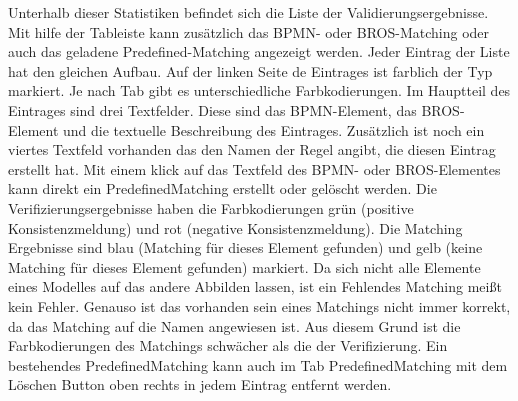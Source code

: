 Unterhalb dieser Statistiken befindet sich die Liste der Validierungsergebnisse.
Mit hilfe der Tableiste kann zusätzlich das BPMN- oder BROS-Matching oder auch das geladene Predefined-Matching angezeigt werden.
Jeder Eintrag der Liste hat den gleichen Aufbau.
Auf der linken Seite de Eintrages ist farblich der Typ markiert. Je nach Tab gibt es unterschiedliche Farbkodierungen.
Im Hauptteil des Eintrages sind drei Textfelder.
Diese sind das BPMN-Element, das BROS-Element und die textuelle Beschreibung des Eintrages.
Zusätzlich ist noch ein viertes Textfeld vorhanden das den Namen der Regel angibt, die diesen Eintrag erstellt hat.
Mit einem klick auf das Textfeld des BPMN- oder BROS-Elementes kann direkt ein PredefinedMatching erstellt oder gelöscht werden.
Die Verifizierungsergebnisse haben die Farbkodierungen grün (positive Konsistenzmeldung) und rot (negative Konsistenzmeldung).
Die Matching Ergebnisse sind blau (Matching für dieses Element gefunden) und gelb (keine Matching für dieses Element gefunden) markiert.
Da sich nicht alle Elemente eines Modelles auf das andere Abbilden lassen, ist ein Fehlendes Matching meißt kein Fehler.
Genauso ist das vorhanden sein eines Matchings nicht immer korrekt, da das Matching auf die Namen angewiesen ist. 
Aus diesem Grund ist die Farbkodierungen des Matchings schwächer als die der Verifizierung.
Ein bestehendes PredefinedMatching kann auch im Tab PredefinedMatching mit dem Löschen Button oben rechts in jedem Eintrag entfernt werden.
